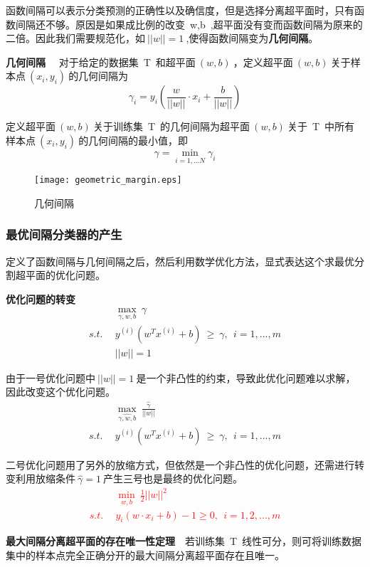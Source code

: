 函数间隔可以表示分类预测的正确性以及确信度，但是选择分离超平面时，只有函数间隔还不够。原因是如果成比例的改变~w,b~,超平面没有变而函数间隔为原来的二倍。因此我们需要规范化，如$~||w||=1~$,使得函数间隔变为\textbf{几何间隔}。

\textbf{几何间隔} ~~对于给定的数据集~T~和超平面$~(w,b)~$，定义超平面$~(w,b)~$关于样本点$~(x_i,y_i)~$的几何间隔为
$$\gamma_i = y_i(\frac{w}{||w||}\cdot x_i+\frac{b}{||w||})$$

定义超平面$~(w,b)~$关于训练集~T~的几何间隔为超平面$~(w,b)~$关于~T~中所有样本点$~(x_i,y_i)~$的几何间隔的最小值，即
$$\gamma = \min \limits_{i=1,...N} \gamma_i$$

\begin{figure}[!htb]
  \centering
  \texttt{[image: geometric\_margin.eps]}
  \caption{几何间隔}
\end{figure}

\subsubsection{最优间隔分类器的产生}
定义了函数间隔与几何间隔之后，然后利用数学优化方法，显式表达这个求最优分割超平面的优化问题。

\textbf{优化问题的转变}
\begin{align}
            &\max \limits_{\gamma,w,b}~\gamma  \nonumber  \\
    s.t.~~  &y^{(i)}(w^Tx^{(i)}+b)~\geq~\gamma,~~i=1,...,m\nonumber\\
            &||w||=1   \nonumber
\end{align}

由于一号优化问题中$~||w||=1~$是一个非凸性的约束，导致此优化问题难以求解，因此改变这个优化问题。
\begin{align}
            &\max \limits_{\hat{\gamma,w,b}}~\frac{\hat{\gamma}}{||w||}  \nonumber  \\
    s.t.~~  &y^{(i)}(w^Tx^{(i)}+b)~\geq~\gamma,~~i=1,...,m \nonumber
\end{align}

二号优化问题用了另外的放缩方式，但依然是一个非凸性的优化问题，还需进行转变利用放缩条件$~\hat{\gamma}=1~$产生三号也是最终的优化问题。
\textcolor{red}{\begin{align}
            &\min \limits_{w,b} ~\frac{1}{2}||w||^2  \nonumber  \\
    s.t.~~  &y_i(w\cdot x_i+b)-1 \geq 0,~~i=1,2,...,m\nonumber
\end{align}}


\textbf{最大间隔分离超平面的存在唯一性定理}~~若训练集~T~线性可分，则可将训练数据集中的样本点完全正确分开的最大间隔分离超平面存在且唯一。

